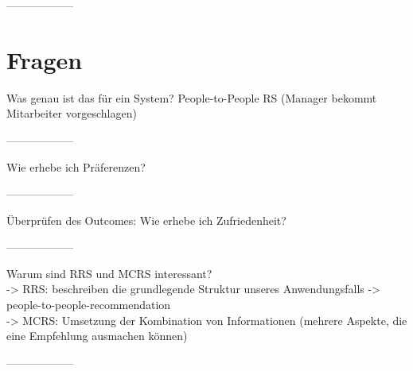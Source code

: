------------------

\newpage

\section{Fragen}
\label{ch:notizen:fragen}

Was genau ist das für ein System? People-to-People RS (Manager bekommt Mitarbeiter vorgeschlagen)

------------------

Wie erhebe ich Präferenzen? %

------------------

Überprüfen des Outcomes:
Wie erhebe ich Zufriedenheit? %

------------------

Warum sind RRS und MCRS interessant?\\
-> RRS: beschreiben die grundlegende Struktur unseres Anwendungsfalls -> people-to-people-recommendation\\
-> MCRS: Umsetzung der Kombination von Informationen (mehrere Aspekte, die eine Empfehlung ausmachen können)

------------------

